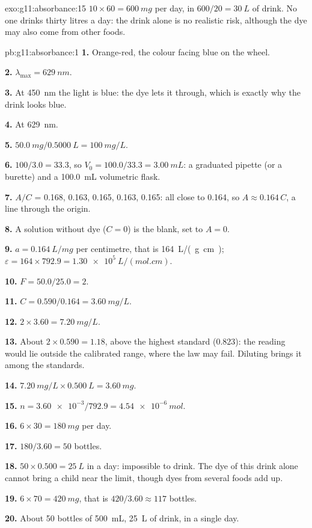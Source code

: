 \begin{solution}{exo:g11:absorbance:15}
$10 \times 60 = \qty{600}{mg}$ per day, in $600 / 20 = \qty{30}{L}$ of
drink. No one drinks thirty litres a day: the drink alone is no realistic
risk, although the dye may also come from other foods.
\end{solution}

\begin{solution}{pb:g11:absorbance:1}
\textbf{1.} Orange-red, the colour facing blue on the wheel.

\textbf{2.} $\lambda_{\max} = \qty{629}{nm}$.

\textbf{3.} At \qty{450}{nm} the light is blue: the dye lets it through,
which is exactly why the drink looks blue.

\textbf{4.} At \qty{629}{nm}.

\textbf{5.} $\qty{50.0}{mg} / \qty{0.5000}{L} = \qty{100}{mg/L}$.

\textbf{6.}  $100 / 3.0 = 33.3$, so
$V_0 = 100.0 / 33.3 = \qty{3.00}{mL}$: a graduated pipette (or a
burette) and a \qty{100.0}{mL} volumetric flask.

\textbf{7.} $A/C$ = 0.168, 0.163, 0.165, 0.163, 0.165: all close to
0.164, so $A \approx 0.164\, C$, a line through the origin.

\textbf{8.} A solution without dye ($C = 0$) is the blank, set to
$A = 0$.

\textbf{9.} $a = \qty{0.164}{L/mg}$ per centimetre, that is
\qty{164}{L/(g.cm)}; $\varepsilon = 164 \times 792.9 =
\qty{1.30e5}{L/(mol.cm)}$.

\textbf{10.} $F = 50.0 / 25.0 = 2$.

\textbf{11.} $C = 0.590 / 0.164 = \qty{3.60}{mg/L}$.

\textbf{12.} $2 \times 3.60 = \qty{7.20}{mg/L}$.

\textbf{13.} About $2 \times 0.590 = 1.18$, above the highest standard
(0.823): the reading would lie outside the calibrated range, where the
law may fail. Diluting brings it among the standards.

\textbf{14.} $\qty{7.20}{mg/L} \times \qty{0.500}{L} = \qty{3.60}{mg}$.

\textbf{15.} $n = \num{3.60e-3} / 792.9 = \qty{4.54e-6}{mol}$.

\textbf{16.} $6 \times 30 = \qty{180}{mg}$ per day.

\textbf{17.} $180 / 3.60 = 50$ bottles.

\textbf{18.} $50 \times 0.500 = \qty{25}{L}$ in a day: impossible to
drink. The dye of this drink alone cannot bring a child near the limit,
though dyes from several foods add up.

\textbf{19.} $6 \times 70 = \qty{420}{mg}$, that is $420 / 3.60 \approx
117$ bottles.

\textbf{20.} About 50 bottles of \qty{500}{mL}, \qty{25}{L} of drink, in
a single day.
\end{solution}
